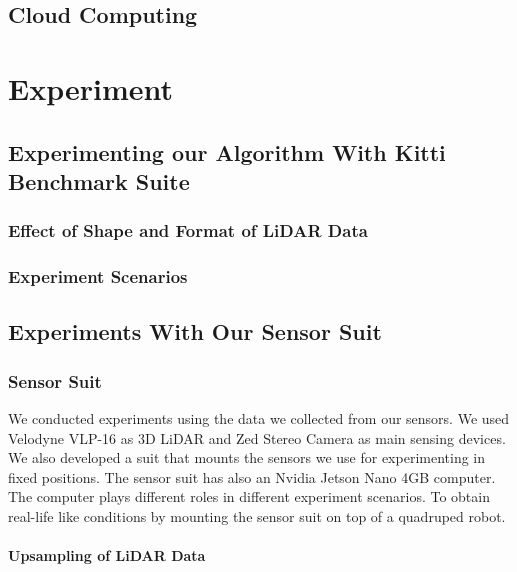 \documentclass[conference]{IEEEtran}
\begin{document}
\subsection{Cloud Computing}

\section{Experiment}

\subsection{Experimenting our Algorithm With Kitti Benchmark Suite}

\subsubsection{Effect of Shape and Format of LiDAR Data}
\subsubsection{Experiment Scenarios}

\subsection{Experiments With Our Sensor Suit}

\subsubsection{Sensor Suit}
We conducted experiments using the data we collected from our sensors. We used Velodyne VLP-16 as 3D LiDAR and Zed Stereo Camera as main sensing devices. We also developed a suit that mounts the sensors we use for experimenting in fixed positions. The sensor suit has also an Nvidia Jetson Nano 4GB computer. The computer plays different roles in different experiment scenarios.
To obtain real-life like conditions by mounting the sensor suit on top of a quadruped robot. 
\paragraph{Upsampling of LiDAR Data}
\end{document}
